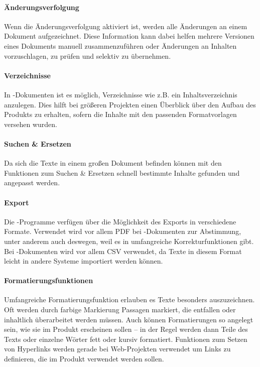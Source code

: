 \paragraph{Änderungsverfolgung} Wenn die Änderungsverfolgung aktiviert ist, werden alle Änderungen an einem Dokument aufgezeichnet. Diese Information kann dabei helfen mehrere Versionen eines Dokuments manuell zusammenzuführen oder Änderungen an Inhalten vorzuschlagen, zu prüfen und selektiv zu übernehmen.

\paragraph{Verzeichnisse} In -Dokumenten ist es möglich, Verzeichnisse wie z.B. ein Inhaltsverzeichnis anzulegen. Dies hilft bei größeren Projekten einen Überblick über den Aufbau des Produkts zu erhalten, sofern die Inhalte mit den passenden Formatvorlagen versehen wurden.

\paragraph{Suchen \& Ersetzen} Da sich die Texte in einem großen Dokument befinden können mit den Funktionen zum Suchen \& Ersetzen schnell bestimmte Inhalte gefunden und angepasst werden.

\paragraph{Export} Die -Programme verfügen über die Möglichkeit des Exports in verschiedene Formate. Verwendet wird vor allem PDF bei -Dokumenten zur Abstimmung, unter anderem auch deswegen, weil es in   umfangreiche Korrekturfunktionen gibt. Bei -Dokumenten wird vor allem CSV verwendet, da Texte in diesem Format leicht in andere Systeme importiert werden können.

\paragraph{Formatierungsfunktionen} Umfangreiche Formatierungsfunktion erlauben es Texte besonders auszuzeichnen. Oft werden durch farbige Markierung Passagen markiert, die entfallen oder inhaltlich überarbeitet werden müssen. Auch können Formatierungen so angelegt sein, wie sie im Produkt erscheinen sollen -- in der Regel werden dann Teile des Texts oder einzelne Wörter fett oder kursiv formatiert. Funktionen zum Setzen von Hyperlinks werden gerade bei Web-Projekten verwendet um Links zu definieren, die im Produkt verwendet werden sollen.

